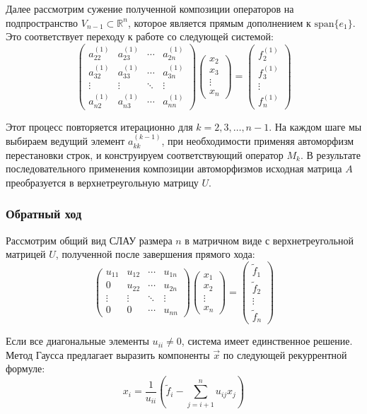 Далее рассмотрим сужение полученной композиции операторов на подпространство $V_{n-1} \subset \mathbb{R}^n$, которое является прямым дополнением к $\text{span}\{e_1\}$. Это соответствует переходу к работе со следующей системой:
\[
  \begin{pmatrix}
    a_{22}^{(1)} & a_{23}^{(1)} & \cdots & a_{2n}^{(1)} \\
    a_{32}^{(1)} & a_{33}^{(1)} & \cdots & a_{3n}^{(1)} \\
    \vdots & \vdots & \ddots & \vdots \\
    a_{n2}^{(1)} & a_{n3}^{(1)} & \cdots & a_{nn}^{(1)}
  \end{pmatrix}
  \begin{pmatrix}
    x_2 \\
    x_3 \\
    \vdots \\
    x_n
  \end{pmatrix}
  =
  \begin{pmatrix}
    f_2^{(1)} \\
    f_3^{(1)} \\
    \vdots \\
    f_n^{(1)}
  \end{pmatrix}
\]

Этот процесс повторяется итерационно для $k = 2, 3, \dots, n-1$. На каждом шаге мы выбираем ведущий элемент $a_{kk}^{(k-1)}$, при необходимости применяя автоморфизм перестановки строк, и конструируем соответствующий оператор $M_k$. В результате последовательного применения композиции автоморфизмов исходная матрица $A$ преобразуется в верхнетреугольную матрицу $U$. 

\subsubsection{Обратный ход}

Рассмотрим общий вид СЛАУ размера $n$ в матричном виде с верхнетреугольной матрицей $U$, полученной после завершения прямого хода:
\[
  \begin{pmatrix}
    u_{11} & u_{12} & \cdots & u_{1n} \\
    0 & u_{22} & \cdots & u_{2n} \\
    \vdots & \vdots & \ddots & \vdots \\
    0 & 0 & \cdots & u_{nn}
  \end{pmatrix}
  \begin{pmatrix}
    x_1 \\
    x_2 \\
    \vdots \\
    x_n
  \end{pmatrix}
  =
  \begin{pmatrix}
    \tilde{f}_1 \\
    \tilde{f}_2 \\
    \vdots \\
    \tilde{f}_n
  \end{pmatrix}
\]

Если все диагональные элементы $u_{ii} \neq 0$, система имеет единственное решение. Метод Гаусса предлагает выразить компоненты $\vec{x}$ по следующей рекуррентной формуле:
\[
  x_i = \frac{1}{u_{ii}} \left( \tilde{f}_i - \sum_{j=i+1}^{n} u_{ij} x_j \right)
\]